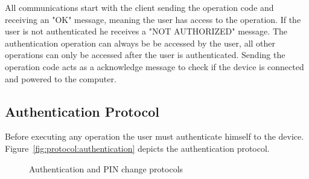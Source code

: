 All communications start with the client sending the operation code and receiving an "OK" message, meaning the user has access to the operation. If the user is not authenticated he receives a "NOT AUTHORIZED" message.
The authentication operation can always be be accessed by the user, all other operations can only be accessed after the user is authenticated.
Sending the operation code acts as a acknowledge message to check if the device is connected and powered to the computer.

\subsection{Authentication Protocol}\label{chap:implementation:protocol:auth}

Before executing any operation the user must authenticate himself to the device.
Figure~\ref{fig:protocol:authentication} depicts the authentication protocol.

\begin{figure}[h!]
	\centering     %
	\caption{Authentication and PIN change protocols}
\end{figure}

